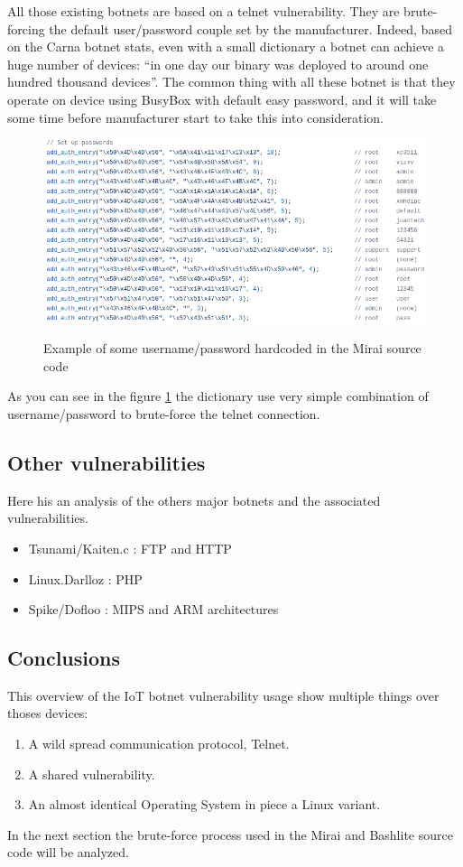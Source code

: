 \documentclass{report}
\begin{document}
All those existing botnets are based on a telnet vulnerability. They are brute-forcing the default user/password couple set by the manufacturer. Indeed, based on the Carna botnet \autocite{carna} stats, even with a small dictionary a botnet can achieve a huge number of devices: ``in one day our binary was deployed to around one hundred thousand devices''.
The common thing with all these botnet is that they operate on device using BusyBox with default easy password, and it will take some time before manufacturer start to take this into consideration.\newline
\begin{figure}[h]
 \caption{Example of some username/password hardcoded in the Mirai source code}
 \centering
 \includegraphics[width=1.2\textwidth]{./img/mirai-dict}
 \label{fig:mirai-dict}
\end{figure}
As you can see in the figure \ref{fig:mirai-dict} the dictionary use very simple combination of username/password to brute-force the telnet connection.

\subsection{Other vulnerabilities}
Here his an analysis of the others major botnets and the associated vulnerabilities.
\begin{itemize}
 \item Tsunami/Kaiten.c \autocite{tsunami} : FTP and HTTP
 \item Linux.Darlloz \autocite{darlloz} : PHP
 \item Spike/Dofloo \autocite{spike} : MIPS and ARM architectures
\end{itemize}

\subsection{Conclusions}
This overview of the IoT botnet vulnerability usage show multiple things over thoses devices:
\begin{enumerate}
 \item A wild spread communication protocol, Telnet.
 \item A shared vulnerability.
 \item An almost identical Operating System in piece a Linux variant.
\end{enumerate}
In the next section the brute-force process used in the Mirai and Bashlite source code will be analyzed.
\end{document}
